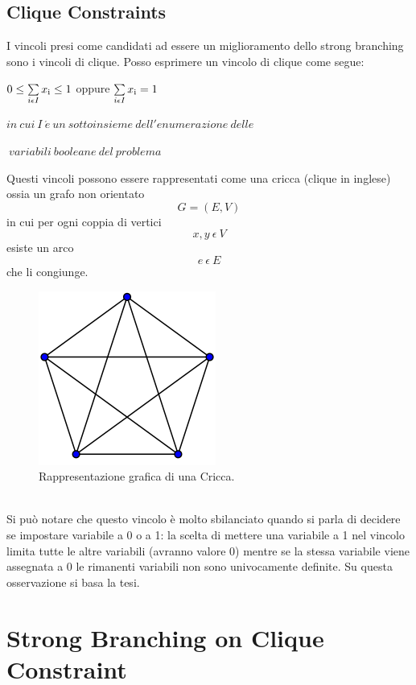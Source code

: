 \documentclass[12pt,a4paper,twoside,openright]{book}
\begin{document}
\section{Clique Constraints}
I vincoli presi come candidati ad essere un miglioramento dello strong branching sono i 
vincoli di clique. Posso esprimere un vincolo di clique come segue:

\begin{center}
    $ 0 \leq \sum\limits_{i \epsilon I}^{} x\textsubscript{i} \leq 1 $  oppure $ \sum\limits_{i \epsilon I}^{} x\textsubscript{i} = 1 $

    $in\:cui\:I\:\acute{e}\:un\:sottoinsieme\:dell'enumerazione\:delle$

    $\:variabili\:booleane\:del\:problema$\linebreak
\end{center}

Questi vincoli possono essere rappresentati come una cricca (clique in inglese) ossia un grafo 
non orientato \[G = (E, V)\] in cui per ogni coppia di vertici \[x,y\:\epsilon\:V\] esiste 
un arco \[e\:\epsilon\:E\] che li congiunge.\pagebreak
\begin{figure}[ht]
    \centering
    \includegraphics [scale = 0.5]{cricca.png}
    \caption{Rappresentazione grafica di una Cricca. }
    \label{fig:cricca}
\end{figure}\\
Si può notare che questo vincolo è molto sbilanciato quando si parla di decidere se impostare
variabile a 0 o a 1: la scelta di mettere una variabile a 1 nel vincolo limita tutte le 
altre variabili (avranno valore 0) mentre se la stessa variabile viene assegnata a 0 le rimanenti variabili 
non sono univocamente definite. Su questa osservazione si basa la tesi.

\chapter{Strong Branching on Clique Constraint}
\end{document}
